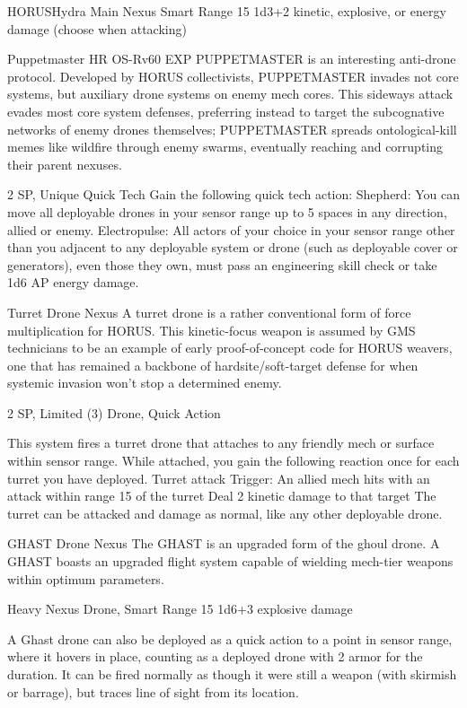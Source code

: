\begin{mech}{HORUS}{Hydra}
Main Nexus
Smart
Range 15
1d3+2 kinetic, explosive, or energy damage (choose when attacking)

Puppetmaster
HR OS-Rv60 EXP PUPPETMASTER is an interesting anti-drone protocol. Developed by HORUS collectivists, PUPPETMASTER invades not core systems, but auxiliary drone systems on enemy mech cores. This sideways attack evades most core system defenses, preferring instead to target the subcognative networks of enemy drones themselves; PUPPETMASTER spreads ontological-kill memes like wildfire through enemy swarms, eventually reaching and corrupting their parent nexuses.

2 SP, Unique
Quick Tech
Gain the following quick tech action:
Shepherd: You can move all deployable drones in your sensor range up to 5 spaces in any direction, allied or enemy.
Electropulse: All actors of your choice in your sensor range other than you adjacent to any deployable system or drone (such as deployable cover or generators), even those they own, must pass an engineering skill check or take 1d6 AP energy damage.

Turret Drone Nexus
A turret drone is a rather conventional form of force multiplication for HORUS. This kinetic-focus weapon is assumed by GMS technicians to be an example of early proof-of-concept code for HORUS weavers, one that has remained a backbone of hardsite/soft-target defense for when systemic invasion won't stop a determined enemy.

2 SP, Limited (3)
Drone, Quick Action

This system fires a turret drone that attaches to any friendly mech or surface within sensor range. While attached, you gain the following reaction once for each turret you have deployed.
	Turret attack
	Trigger: An allied mech hits with an attack within range 15 of the turret
	Deal 2 kinetic damage to that target
The turret can be attacked and damage as normal, like any other deployable drone.

GHAST Drone Nexus
The GHAST is an upgraded form of the ghoul drone. A GHAST boasts an upgraded flight system capable of wielding mech-tier weapons within optimum parameters.

Heavy Nexus
Drone, Smart
Range 15
1d6+3 explosive damage

A Ghast drone can also be deployed as a quick action to a point in sensor range, where it hovers in place, counting as a deployed drone with 2 armor for the duration. It can be fired normally as though it were still a weapon (with skirmish or barrage), but traces line of sight from its location.


\end{mech}
